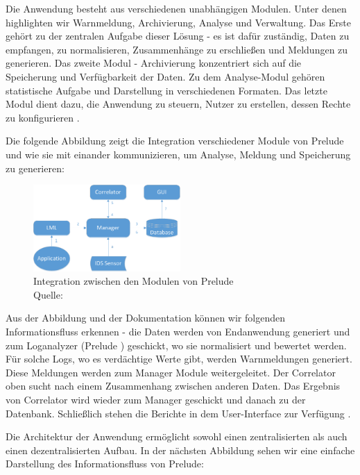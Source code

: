 Die Anwendung besteht aus verschiedenen unabhängigen Modulen. Unter denen highlighten wir Warnmeldung, Archivierung, Analyse und Verwaltung. Das Erste gehört zu der zentralen Aufgabe dieser Lösung - es ist dafür zuständig, Daten zu empfangen, zu normalisieren, Zusammenhänge zu erschließen und Meldungen zu generieren. Das zweite Modul - Archivierung konzentriert sich auf die Speicherung und Verfügbarkeit der Daten. Zu dem Analyse-Modul gehören statistische Aufgabe und Darstellung in verschiedenen Formaten. Das letzte Modul dient dazu, die Anwendung zu steuern, Nutzer zu erstellen, dessen Rechte zu konfigurieren \citep{EC_Prelude}. 

Die folgende Abbildung zeigt die Integration verschiedener Module von Prelude und wie sie mit einander kommunizieren, um Analyse, Meldung und Speicherung zu generieren:

\begin{figure}[H]
   \centering
   \includegraphics[width=0.5\textwidth]{assets/2_p3.png}
   \caption[Integration zwischen den Modulen von Prelude ]
   {Integration zwischen den Modulen von Prelude \\Quelle: \citep{Prelude_MU} }
   \centering
\end{figure}

Aus der Abbildung und der Dokumentation können wir folgenden Informationsfluss erkennen - die Daten werden von Endanwendung generiert und zum Loganalyzer (Prelude ) geschickt, wo sie normalisiert und bewertet werden. Für solche Logs, wo es verdächtige Werte gibt, werden Warnmeldungen generiert. Diese Meldungen werden zum Manager Module weitergeleitet. Der Correlator oben sucht nach einem Zusammenhang zwischen anderen Daten. Das Ergebnis von Correlator wird wieder zum Manager geschickt und danach zu der Datenbank. Schließlich stehen die Berichte in dem User-Interface zur Verfügung \citep{Prelude_Doc}.

Die Architektur der Anwendung ermöglicht sowohl einen zentralisierten als auch einen dezentralisierten Aufbau. In der nächsten Abbildung sehen wir eine einfache Darstellung des Informationsfluss von Prelude:

